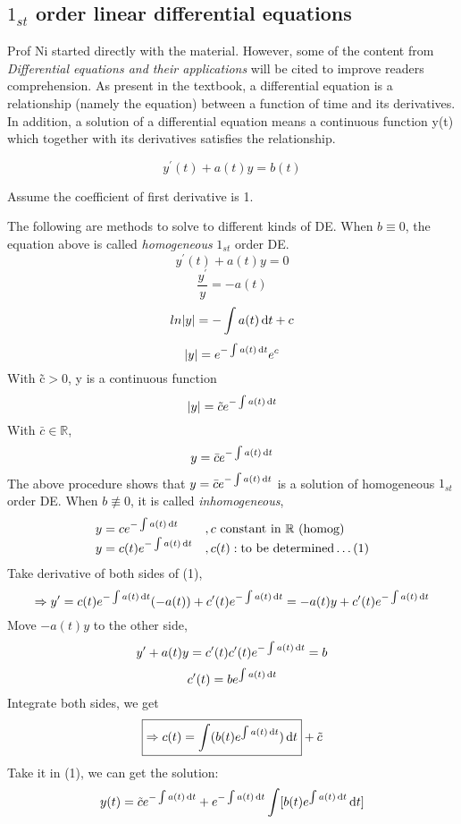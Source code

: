 \subsection{$1_{st}$ order linear differential equations}
Prof Ni started directly with the material. However, some of the content from {\it Differential equations and their applications} will be cited to improve readers comprehension.
As present in the textbook, a differential equation is a relationship (namely the equation) between a function of time and its derivatives. In addition, a solution of a differential equation means a continuous function y(t) which together with its derivatives satisfies the relationship.
\begin{definition}
\[y^{\prime}(t)+a(t)y=b(t)
\]
\end{definition}
\begin{remark}
Assume the coefficient of first derivative is 1.
\end{remark}
The following are methods to solve to different kinds of DE.
When $b\equiv 0$, the equation above is called \emph{homogeneous} $1_{st}$ order DE.
\[y^{\prime}(t)+a(t)y=0
\]
\[\frac{y^{\prime}}{y}=-a(t)
\]
\[ln|y|=-\int a(t)\,\mathrm{d} t+c
\]
\[|y|=e^{-\int a(t)\,\mathrm{d} t}e^c
\]With \~{c}$>0$, y is a continuous function 
\[|y|= \tilde{c}  e^{-\int a(t)\,\mathrm{d} t}
\]
With $\bar{c}\in\mathbb{R}$,
\[y=\bar{c}e^{-\int a(t)\,\mathrm{d} t}
\]
The above procedure shows that $y=\bar{c}e^{-\int a(t)\,\mathrm{d} t}$ is a solution of homogeneous $1_{st}$ order DE.
When $b\not\equiv 0$, it is called \emph{inhomogeneous}, 
\[
\begin{array}{ll}
y=ce^{-\int a(t)\,\mathrm{d} t}&,c \mbox{ constant in }\mathbb{R} \mbox{ (homog)}\\
y=c(t)e^{-\int a(t)\,\mathrm{d} t}&,c(t): \mbox{to be determined}\dots(1)\\
\end{array}
\]
Take derivative of both sides of  (1),
\[\Rightarrow y^{\prime}=c(t)e^{-\int a(t)\,\mathrm{d} t}(-a(t))+c^{\prime}(t)e^{-\int a(t)\,\mathrm{d} t}=-a(t)y+c^{\prime}(t)e^{-\int a(t)\,\mathrm{d} t}
\]
Move $-a(t)y$ to the other side,
\[y^{\prime}+a(t)y=c^{\prime}(t)c^{\prime}(t)e^{-\int a(t)\,\mathrm{d} t}=b
\]
\[c^{\prime}(t)=be^{\int a(t)\,\mathrm{d} t}
\]
Integrate both sides, we get
\[\boxed{\Rightarrow c(t)=\int(b(t)e^{\int a(t)\,\mathrm{d} t})\,\mathrm{d} t}+\tilde{c}
\]
Take it in (1), we can get the solution:
\[y(t)=\tilde{c}e^{-\int a(t)\,\mathrm{d} t}+e^{-\int a(t)\,\mathrm{d} t}\int[b(t)e^{\int a(t)\,\mathrm{d} t}\,\mathrm{d} t]
\]

